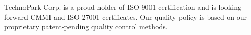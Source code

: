 TechnoPark Corp. is a proud holder of ISO 9001 certification and
is looking forward CMMI and ISO 27001 certificates. Our quality policy
is based on our proprietary patent-pending quality control methods.
